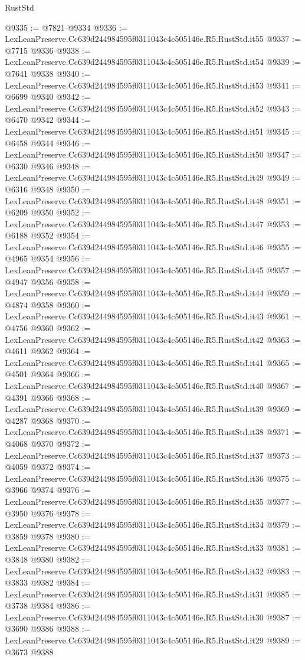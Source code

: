 \begin{lexlean}{RustStd}
\begin{coremodule}
@9335 := @7821 @9334
@9336 := LexLeanPreserve.Cc639d244984595f0311043c4c505146e.R5.RustStd.it55
@9337 := @7715 @9336
@9338 := LexLeanPreserve.Cc639d244984595f0311043c4c505146e.R5.RustStd.it54
@9339 := @7641 @9338
@9340 := LexLeanPreserve.Cc639d244984595f0311043c4c505146e.R5.RustStd.it53
@9341 := @6699 @9340
@9342 := LexLeanPreserve.Cc639d244984595f0311043c4c505146e.R5.RustStd.it52
@9343 := @6470 @9342
@9344 := LexLeanPreserve.Cc639d244984595f0311043c4c505146e.R5.RustStd.it51
@9345 := @6458 @9344
@9346 := LexLeanPreserve.Cc639d244984595f0311043c4c505146e.R5.RustStd.it50
@9347 := @6330 @9346
@9348 := LexLeanPreserve.Cc639d244984595f0311043c4c505146e.R5.RustStd.it49
@9349 := @6316 @9348
@9350 := LexLeanPreserve.Cc639d244984595f0311043c4c505146e.R5.RustStd.it48
@9351 := @6209 @9350
@9352 := LexLeanPreserve.Cc639d244984595f0311043c4c505146e.R5.RustStd.it47
@9353 := @6188 @9352
@9354 := LexLeanPreserve.Cc639d244984595f0311043c4c505146e.R5.RustStd.it46
@9355 := @4965 @9354
@9356 := LexLeanPreserve.Cc639d244984595f0311043c4c505146e.R5.RustStd.it45
@9357 := @4947 @9356
@9358 := LexLeanPreserve.Cc639d244984595f0311043c4c505146e.R5.RustStd.it44
@9359 := @4874 @9358
@9360 := LexLeanPreserve.Cc639d244984595f0311043c4c505146e.R5.RustStd.it43
@9361 := @4756 @9360
@9362 := LexLeanPreserve.Cc639d244984595f0311043c4c505146e.R5.RustStd.it42
@9363 := @4611 @9362
@9364 := LexLeanPreserve.Cc639d244984595f0311043c4c505146e.R5.RustStd.it41
@9365 := @4501 @9364
@9366 := LexLeanPreserve.Cc639d244984595f0311043c4c505146e.R5.RustStd.it40
@9367 := @4391 @9366
@9368 := LexLeanPreserve.Cc639d244984595f0311043c4c505146e.R5.RustStd.it39
@9369 := @4287 @9368
@9370 := LexLeanPreserve.Cc639d244984595f0311043c4c505146e.R5.RustStd.it38
@9371 := @4068 @9370
@9372 := LexLeanPreserve.Cc639d244984595f0311043c4c505146e.R5.RustStd.it37
@9373 := @4059 @9372
@9374 := LexLeanPreserve.Cc639d244984595f0311043c4c505146e.R5.RustStd.it36
@9375 := @3966 @9374
@9376 := LexLeanPreserve.Cc639d244984595f0311043c4c505146e.R5.RustStd.it35
@9377 := @3950 @9376
@9378 := LexLeanPreserve.Cc639d244984595f0311043c4c505146e.R5.RustStd.it34
@9379 := @3859 @9378
@9380 := LexLeanPreserve.Cc639d244984595f0311043c4c505146e.R5.RustStd.it33
@9381 := @3848 @9380
@9382 := LexLeanPreserve.Cc639d244984595f0311043c4c505146e.R5.RustStd.it32
@9383 := @3833 @9382
@9384 := LexLeanPreserve.Cc639d244984595f0311043c4c505146e.R5.RustStd.it31
@9385 := @3738 @9384
@9386 := LexLeanPreserve.Cc639d244984595f0311043c4c505146e.R5.RustStd.it30
@9387 := @3690 @9386
@9388 := LexLeanPreserve.Cc639d244984595f0311043c4c505146e.R5.RustStd.it29
@9389 := @3673 @9388

\end{coremodule}
\end{lexlean}
